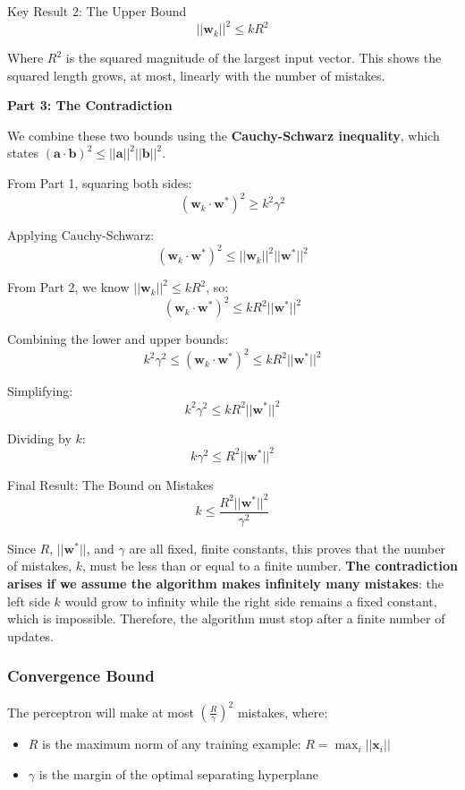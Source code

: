 \begin{block}{Key Result 2: The Upper Bound}
\[||\mathbf{w}_k||^2 \leq k R^2\]
\end{block}

Where \(R^2\) is the squared magnitude of the largest input vector. This shows the squared length grows, at most, linearly with the number of mistakes.

\textbf{Part 3: The Contradiction}

We combine these two bounds using the \textbf{Cauchy-Schwarz inequality}, which states \((\mathbf{a} \cdot \mathbf{b})^2 \leq ||\mathbf{a}||^2 ||\mathbf{b}||^2\).

From Part 1, squaring both sides:
\[(\mathbf{w}_k \cdot \mathbf{w}^*)^2 \geq k^2\gamma^2\]

Applying Cauchy-Schwarz:
\[(\mathbf{w}_k \cdot \mathbf{w}^*)^2 \leq ||\mathbf{w}_k||^2 ||\mathbf{w}^*||^2\]

From Part 2, we know \(||\mathbf{w}_k||^2 \leq kR^2\), so:
\[(\mathbf{w}_k \cdot \mathbf{w}^*)^2 \leq kR^2 ||\mathbf{w}^*||^2\]

Combining the lower and upper bounds:
\[k^2\gamma^2 \leq (\mathbf{w}_k \cdot \mathbf{w}^*)^2 \leq kR^2 ||\mathbf{w}^*||^2\]

Simplifying:
\[k^2\gamma^2 \leq kR^2 ||\mathbf{w}^*||^2\]

Dividing by \(k\):
\[k\gamma^2 \leq R^2 ||\mathbf{w}^*||^2\]

\begin{block}{Final Result: The Bound on Mistakes}
\[k \leq \frac{R^2 ||\mathbf{w}^*||^2}{\gamma^2}\]
\end{block}

Since \(R\), \(||\mathbf{w}^*||\), and \(\gamma\) are all fixed, finite constants, this proves that the number of mistakes, \(k\), must be less than or equal to a finite number. \textbf{The contradiction arises if we assume the algorithm makes infinitely many mistakes}: the left side \(k\) would grow to infinity while the right side remains a fixed constant, which is impossible. Therefore, the algorithm must stop after a finite number of updates.

\subsubsection{Convergence Bound}
The perceptron will make at most \(\left(\frac{R}{\gamma}\right)^2\) mistakes, where:
\begin{itemize}
    \item \(R\) is the maximum norm of any training example: \(R = \max_i ||\mathbf{x}_i||\)
    \item \(\gamma\) is the margin of the optimal separating hyperplane
\end{itemize}

